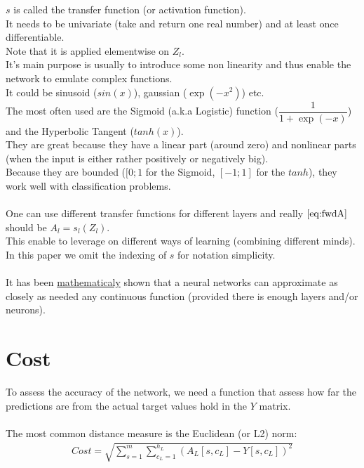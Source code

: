 \documentclass[]{article}
\begin{document}
$s$ is called the transfer function (or activation function).\\
It needs to be univariate (take and return one real number) and at least once differentiable.\\
Note that it is applied elementwise on $Z_l$.\\
It's main purpose is usually to introduce some non linearity and thus enable the network to emulate complex functions.\\
It could be sinusoid ($sin(x)$), gaussian ($\exp(-x^2)$) etc.\\
The most often used are the Sigmoid (a.k.a Logistic) function ($\dfrac{1}{1+\exp(-x)}$) and the Hyperbolic Tangent ($tanh(x)$).\\
They are great because they have a linear part (around zero) and nonlinear parts (when the input is either rather positively or negatively big).\\
Because they are bounded ($[0;1$ for the Sigmoid, $[-1;1]$ for the $tanh$), they work well with classification problems.\\
\\
One can use different transfer functions for different layers and really $\eqref{eq:fwdA}$ should be $A_l=s_l(Z_{l})$.\\
This enable to leverage on different ways of learning (combining different minds).\\
In this paper we omit the indexing of $s$ for notation simplicity.\\
\\
It has been \href{http://www.sciencedirect.com/science/article/pii/0893608089900208}{mathematicaly} shown that a neural networks can approximate as closely as needed any continuous function (provided there is enough layers and/or neurons).\\



\section{Cost}

To assess the accuracy of the network, we need a function that assess how far the predictions are from the actual target values hold in the $Y$ matrix.\\
\\
The most common distance measure is the Euclidean (or L2) norm:\\
\begin{align*}
Cost= \sqrt{ \sum_{s=1}^{m}\sum_{c_L=1}^{h_L}(A_L[s,c_L]-Y[s,c_L])^2 }
\end{align*}
\end{document}
